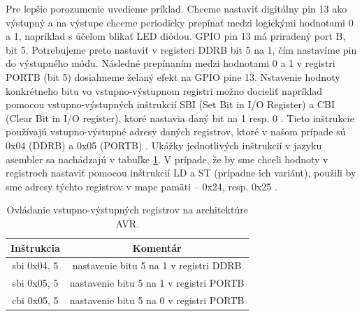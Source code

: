 Pre lepšie porozumenie uvedieme príklad. Chceme nastaviť digitálny pin 13 ako výstupný a na výstupe chceme periodicky prepínať medzi logickými hodnotami 0 a 1, napríklad s účelom blikať LED diódou. GPIO pin 13 má priradený port B, bit 5. Potrebujeme preto nastaviť v registeri DDRB bit 5 na 1, čím nastavíme pin do výstupného módu. Následné prepínaním medzi hodnotami 0 a 1 v registri PORTB (bit 5) dosiahneme želaný efekt na GPIO pine 13. Nstavenie hodnoty konkrétneho bitu vo vstupno-výstupnom registri možno docieliť napríklad pomocou vstupno-výstupných inštrukcií SBI (Set Bit in I/O Register) a CBI (Clear Bit in I/O register), ktoré nastavia daný bit na 1 resp. 0 \cite{avrInstruction}. Tieto inštrukcie používajú vstupno-výstupné adresy daných registrov, ktoré v našom prípade sú 0x04 (DDRB) a 0x05 (PORTB) \cite{atmegaData}. Ukážky jednotlivých inštrukcií v jazyku asembler sa nachádzajú v tabuľke \ref{tab:ovladanieVV}. V prípade, že by sme chceli hodnoty v registroch nastaviť pomocou inštrukcií LD a ST (prípadne ich variánt), použili by sme adresy týchto registrov v mape pamäti -- 0x24, resp. 0x25 \cite{atmegaData}.

\begin{table}
    \caption[Ovládanie vstupno-výstupných registrov na architektúre AVR]{Ovládanie vstupno-výstupných registrov na architektúre AVR.}
    \label{tab:ovladanieVV}
    \begin{center}
    \begin{tabular}{|c|c|}
        \hline 
        Inštrukcia & Komentár \\
        \hline
        sbi 0x04, 5 & nastavenie bitu 5 na 1 v registri DDRB \\
        \hline
        sbi 0x05, 5 & nastavenie bitu 5 na 1 v registri PORTB \\
        \hline
        cbi 0x05, 5 & nastavenie bitu 5 na 0 v registri PORTB \\
        \hline
    \end{tabular}
    \end{center}
\end{table}

